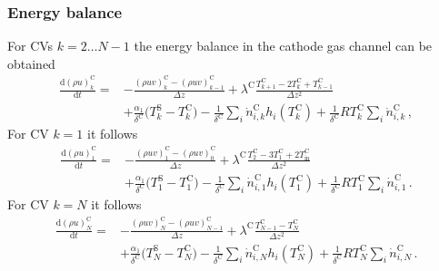 \documentclass[pdftex,a4paper, 12pt]{article}
\begin{document}
\subsubsection*{Energy balance}
%
%
For CVs $k=2 \dots N-1$ the energy balance in the cathode gas channel can be obtained
%
\begin{align}
	\frac{\mathrm{d} (\rho u)_{k}^{\mathrm{C}}}{\mathrm{d} t} = &-\frac{(\rho u v)_{k}^{\mathrm{C}} 
		- (\rho u v)_{k-1}^{\mathrm{C}} }{\Delta z} 
	+ \lambda^{\mathrm{C}} \frac{T_{k+1}^{\mathrm{C}} -2T_{k}^{\mathrm{C}} +T_{k-1}^{\mathrm{C}}}{\Delta z^2} \nonumber \\ &+ \frac{\alpha_1}{\delta^{\mathrm{C}}} \big( T_{k}^{\mathrm{S}} - T_{k}^{\mathrm{C}} \big) - \frac{1}{\delta^{\mathrm{C}}} \sum_{i} \dot{n}_{i,k}^{\mathrm{C}} h_{i}(T_k^{\mathrm{C}}) + \frac{1}{\delta^{\mathrm{C}}} R T_k^{\mathrm{C}} \sum_{i} \dot{n}_{i,k}^{\mathrm{C}} \, ,
	\label{eq:energy_balC_disc}
\end{align}
%
%
For CV $k = 1$ it follows
%
\begin{align}
	\frac{\mathrm{d} (\rho u)_{1}^{\mathrm{C}}}{\mathrm{d} t} = & -\frac{(\rho u v)_{1}^{\mathrm{C}} 
		- (\rho u v)_{0}^{\mathrm{C}} }{\Delta z}
	+ \lambda^{\mathrm{C}} \frac{T_{2}^{\mathrm{C}} - 3 T_{1}^{\mathrm{C}} +2 T_{\mathrm{in}}^{\mathrm{C}}}{\Delta z^2}  \nonumber \\ &+ \frac{\alpha_1}{\delta^{\mathrm{C}}} \big( T_{1}^{\mathrm{S}} - T_{1}^{\mathrm{C}} \big) - \frac{1}{\delta^{\mathrm{C}}} \sum_{i} \dot{n}_{i,1}^{\mathrm{C}} h_{i}(T_1^{\mathrm{C}}) + \frac{1}{\delta^{\mathrm{C}}} R T_1^{\mathrm{C}} \sum_{i} \dot{n}_{i,1}^{\mathrm{C}} \, .
	\label{eq:energy_balC_disc1}
\end{align}
%
For CV $k = N$ it follows
%
\begin{align}
	\frac{\mathrm{d} (\rho u)_{N}^{\mathrm{C}}}{\mathrm{d} t} = & - \frac{(\rho u v)_{N}^{\mathrm{C}} 
		- (\rho u v)_{N-1}^{\mathrm{C}} }{\Delta z}
	+ \lambda^{\mathrm{C}} \frac{T_{N-1}^{\mathrm{C}} - T_{N}^{\mathrm{C}}}{\Delta z^2}  \nonumber \\ &+ \frac{\alpha_1}{\delta^{\mathrm{C}}} \big( T_{N}^{\mathrm{S}} - T_{N}^{\mathrm{C}} \big) - \frac{1}{\delta^{\mathrm{C}}} \sum_{i} \dot{n}_{i,N}^{\mathrm{C}} h_{i}(T_N^{\mathrm{C}}) + \frac{1}{\delta^{\mathrm{C}}} R T_N^{\mathrm{C}} \sum_{i} \dot{n}_{i,N}^{\mathrm{C}} \, .
	\label{eq:energy_balC_discN}
\end{align}
%
%
\end{document}
